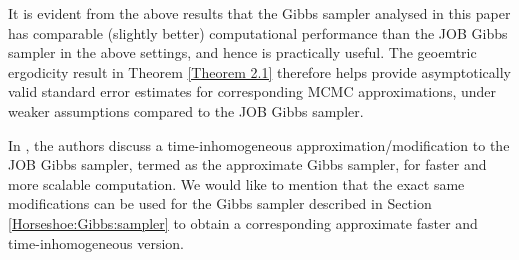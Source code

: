 \documentclass[noinfoline,11pt]{imsart}
\numberwithin{equation}{section}
\theoremstyle{plain}
\begin{document}
It is evident from the above results that the Gibbs sampler analysed in this paper has comparable (slightly better) computational performance than the JOB Gibbs sampler in the above settings, and hence is practically useful. The geoemtric ergodicity result in Theorem \ref{Theorem 2.1} therefore helps provide asymptotically valid standard error estimates for corresponding MCMC approximations, under weaker assumptions compared to the JOB Gibbs sampler. 

In \cite{johndrow2017bayes}, the authors discuss a time-inhomogeneous approximation/modification to the JOB Gibbs sampler, termed as the approximate Gibbs sampler, for faster and more scalable computation. We would like to mention that the exact same modifications can be used for the Gibbs sampler described in 
Section \ref{Horseshoe:Gibbs:sampler} to obtain a corresponding approximate faster 
and time-inhomogeneous version. 
\end{document}

